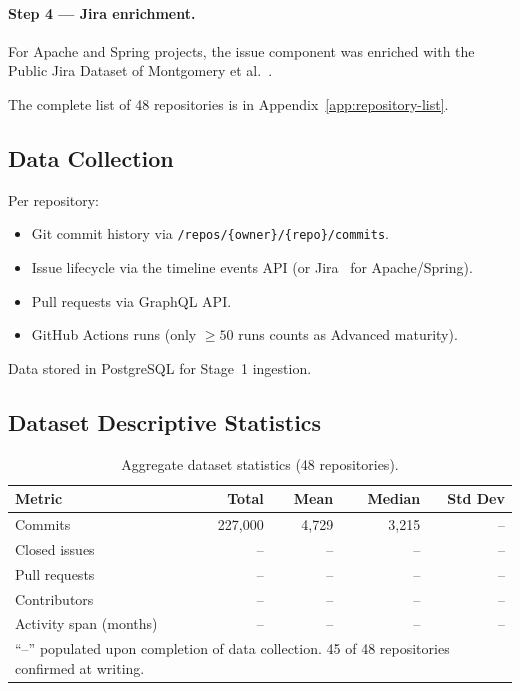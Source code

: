 \paragraph{Step 4 — Jira enrichment.} For Apache and Spring projects,
the issue component was enriched with the Public Jira Dataset of
Montgomery et al.~\cite{montgomery2022jira}.

The complete list of 48 repositories is in
Appendix~\ref{app:repository-list}.


\subsection{Data Collection}
\label{sec:data-collection}

Per repository:
\begin{itemize}
    \item Git commit history via
    \texttt{/repos/\{owner\}/\{repo\}/commits}.
    \item Issue lifecycle via the timeline events API
    (or Jira~\cite{montgomery2022jira} for Apache/Spring).
    \item Pull requests via GraphQL API.
    \item GitHub Actions runs (only $\geq 50$ runs counts as Advanced
    maturity).
\end{itemize}

Data stored in PostgreSQL for Stage~1 ingestion.


\subsection{Dataset Descriptive Statistics}
\label{sec:dataset-stats}

\begin{table}[htbp]
\centering
\caption{Aggregate dataset statistics (48 repositories).}
\label{tab:dataset-summary}
\begin{tabular}{lrrrr}
\toprule
\textbf{Metric} & \textbf{Total} & \textbf{Mean} & \textbf{Median} & \textbf{Std Dev} \\
\midrule
Commits                 & 227{,}000 & 4{,}729 & 3{,}215 & -- \\
Closed issues           & --        & --      & --      & -- \\
Pull requests           & --        & --      & --      & -- \\
Contributors            & --        & --      & --      & -- \\
Activity span (months)  & --        & --      & --      & -- \\
\bottomrule
\multicolumn{5}{l}{\parbox{13cm}{\footnotesize ``--'' populated upon completion of
    data collection. 45 of 48 repositories confirmed at writing.}}
\end{tabular}
\end{table}

